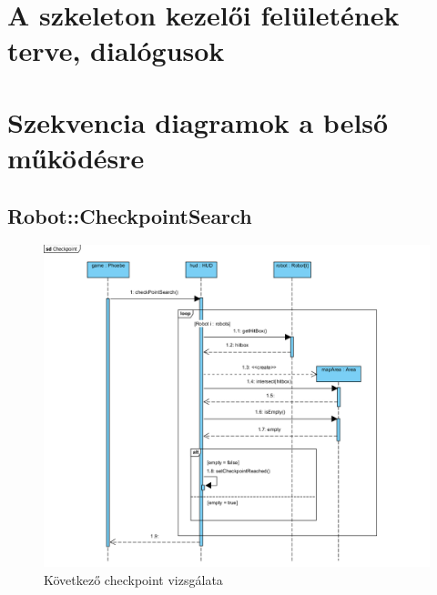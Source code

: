 \section{A szkeleton kezelői felületének terve, dialógusok}

\section{Szekvencia diagramok a belső működésre}

\pagebreak
\subsection{Robot::CheckpointSearch}
\begin{figure}[h]
\begin{center}
\includegraphics[width=17cm]{images/CheckpointSearch.PNG}
\caption{Következő checkpoint vizsgálata}
\label{fig:example2}
\end{center}
\end{figure}
\pagebreak

